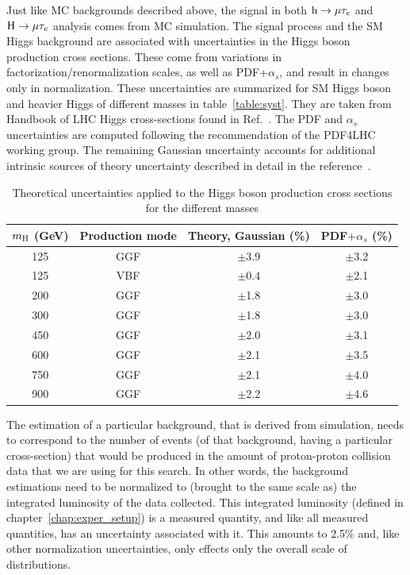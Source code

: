 Just like MC backgrounds described above, the signal in both $\text{h} \to \mu \tau_{e}$ and $\text{H} \to \mu \tau_{e}$ analysis comes from MC simulation. The signal process and the SM Higgs background are associated with uncertainties in the Higgs boson production cross sections. These come from variations in factorization/renormalization scales, as well as PDF+$\alpha_s$, and result in changes only in normalization. These uncertainties are summarized for SM Higgs boson and heavier Higgs of different masses in table~\ref{table:syst}. They are taken from Handbook of LHC Higgs cross-sections found in Ref.~\cite{YR4}. The PDF and $\alpha_s$ uncertainties are computed following the recommendation of the PDF4LHC working group. The remaining Gaussian uncertainty accounts for additional intrinsic sources of theory uncertainty described in detail in the reference~\cite{HIG-18-017}.

\begin{table}[!htbp]
  \begin{center}
  \caption{ Theoretical uncertainties applied to the Higgs boson production cross sections for the different masses}
  \begin{tabular} {cccc}
    \hline
    $m_{\text{H}}$  (GeV) &Production mode&Theory, Gaussian (\%) & PDF$+\alpha_s$  (\%)\\\hline
125 & GGF&$\pm$3.9
&$\pm$3.2\\
125 & VBF&$\pm$0.4
&$\pm$2.1\\
200 & GGF &$\pm$1.8
&$\pm$3.0\\
300&GGF&$\pm$1.8
&$\pm$3.0\\
450&GGF
&$\pm$2.0
&$\pm$3.1\\
600&GGF
&$\pm$2.1
&$\pm$3.5\\
750&GGF
&$\pm$2.1
&$\pm$4.0\\
900&GGF
&$\pm$2.2
&$\pm$4.6\\\hline
  \end{tabular}
  \label{tabe:syst_signal}
\end{center}
\end{table}



The estimation of a particular background, that is derived from simulation, needs to correspond to the number of events (of that background, having a particular cross-section) that would be produced in the amount of proton-proton collision data that we are using for this search. In other words, the background estimations need to be normalized to (brought to the same scale as) the integrated luminosity of the data collected. This integrated luminosity (defined in chapter~\ref{chap:exper_setup}) is a measured quantity, and like all measured quantities, has an uncertainty associated with it. This amounts to 2.5\% and, like other normalization uncertainties, only effects only the overall scale of distributions.  




